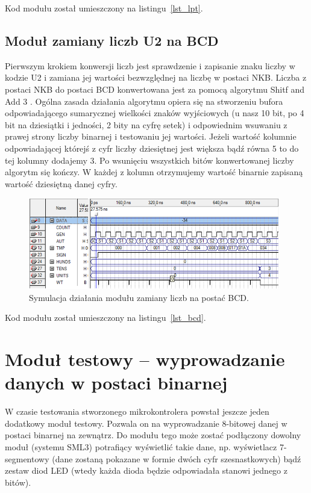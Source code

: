 \documentclass[a4paper,12pt]{report}
\begin{document}
Kod modułu został umieszczony na listingu~\ref{lst_lpt}.

\subsection{Moduł zamiany liczb U2 na BCD}

Pierwszym krokiem konwersji liczb jest sprawdzenie i zapisanie znaku liczby w kodzie U2 i zamiana jej wartości bezwzględnej na liczbę w postaci NKB. Liczba z postaci NKB do postaci BCD konwertowana jest za pomocą algorytmu Shitf and Add 3 . Ogólna zasada działania algorytmu opiera się na stworzeniu bufora odpowiadającego sumarycznej wielkości znaków wyjściowych (u nasz 10 bit, po 4 bit na dziesiątki i jedności, 2 bity na cyfrę setek) i odpowiednim wsuwaniu z prawej strony liczby binarnej i testowaniu jej wartości. Jeżeli wartość kolumnie odpowiadającej którejś z cyfr liczby dziesiętnej jest większa bądź równa 5 to do tej kolumny dodajemy 3. Po wsunięciu wszystkich bitów konwertowanej liczby algorytm się kończy. W każdej z kolumn otrzymujemy wartość binarnie zapisaną wartość dziesiętną danej cyfry.

\begin{figure}[h]
\centering
\includegraphics[width=11cm]{./pict/BCD_sim.png}
\caption{Symulacja działania modułu zamiany liczb na postać BCD.}
\label{fig:lBCD_sim}
\end{figure}

Kod modułu został umieszczony na listingu~\ref{lst_bcd}.

\section{Moduł testowy -- wyprowadzanie danych w postaci binarnej}
W czasie testowania stworzonego mikrokontrolera powstał jeszcze jeden dodatkowy moduł testowy. Pozwala on na wyprowadzanie 8-bitowej danej w postaci binarnej na zewnątrz. Do modułu tego może zostać podłączony dowolny moduł (systemu SML3) potrafiący wyświetlić takie dane, np. wyświetlacz 7-segmentowy (dane zostaną pokazane w formie dwóch cyfr szesnastkowych) bądź zestaw diod LED (wtedy każda dioda będzie odpowiadała stanowi jednego z bitów).
\end{document}
